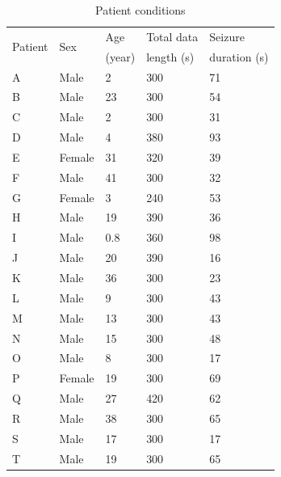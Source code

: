 \documentclass[journal]{IEEEtran}
\begin{document}
\begin{table}[!t]
\centering
 \caption{Patient conditions}
 \label{table:conditions}
  \begin{tabular}{lllll}%
   \toprule %
   \multirow{2}{*}{Patient} &  \multirow{2}{*}{Sex} &  Age  & Total data & Seizure \\
   & & (year) &  length (s) & duration (s) \\
   \midrule %
   A & Male & 2 & 300 & 71\\ %
   B & Male & 23 & 300 & 54\\ %
   C & Male & 2 & 300 & 31\\ %
   D & Male & 4 & 380 & 93\\ %
   E & Female & 31 & 320  & 39\\ %
   F & Male & 41 & 300 & 32\\%
   G & Female & 3 & 240 & 53\\%
   H & Male & 19 & 390 & 36\\ %
   I & Male & 0.8 & 360  & 98\\ %
   J & Male & 20 & 390 & 16\\ %
   K & Male & 36 & 300 & 23\\ %
   L & Male & 9 & 300 & 43\\ %
   M & Male & 13 & 300  & 43\\ %
   N & Male & 15 & 300 & 48\\%
   O & Male & 8 & 300 & 17\\ %
   P & Female & 19 & 300 & 69\\ %
   Q & Male & 27 & 420 & 62\\ %
	 R & Male & 38 & 300 & 65\\ %
	 S & Male & 17 & 300 & 17\\ %
	 T & Male & 19 & 300 & 65\\ %
   \bottomrule %
  \end{tabular}
\end{table}

\end{document}
